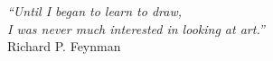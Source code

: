 \cleardoublepage
\thispagestyle{plain}

\vspace*{8cm}

\begin{flushright}
  \textsl{``Until I began to learn to draw, \\
    I was never much interested in looking at art.''}\\
\vspace*{1.5cm}
    Richard P. Feynman
\end{flushright}
